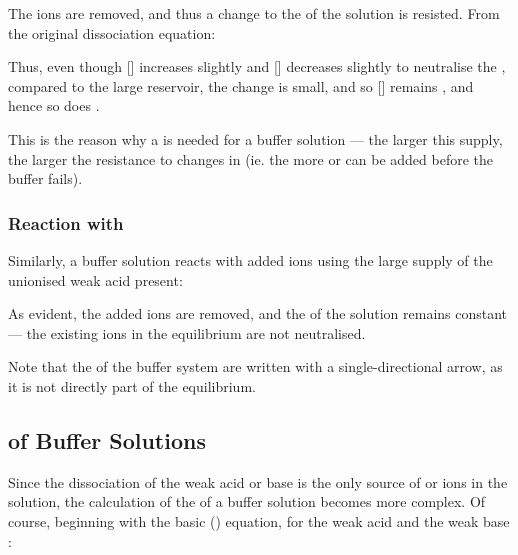 				The  ions are removed, and thus a change to the \pH{} of the solution is resisted. From the original dissociation
				equation:

				\diagram[1.5]{
					$[H^{+}] = \MKa \times \frac{[CH_{3}CO_{2}H]}{[CH_{3}CO_{2}^{-}]}$
				}{}

				Thus, even though [] increases slightly and [] decreases slightly to neutralise the , compared
				to the large reservoir, the change is small, and so [] remains , and hence so does \pH{}.

				This is the reason why a  is needed for a buffer solution --- the larger this supply, the larger the
				resistance to changes in \pH{} (ie. the more  or  can be added before the buffer fails).



			\pagebreak
			\subsubsection{Reaction with \texorpdfstring{}{OH⁻}}

				Similarly, a buffer solution reacts with added  ions using the large supply of the unionised weak acid present:


				As evident, the added  ions are removed, and the \pH{} of the solution remains constant --- the existing  ions
				in the equilibrium are not neutralised.

				Note that the  of the buffer system are written with a single-directional arrow, as it is not
				directly part of the equilibrium.



		\subsection{\texorpdfstring{\pH{}}{pH} of Buffer Solutions}

			Since the dissociation of the weak acid or base is  the only source of  or  ions in the solution,
			the calculation of the \pH{} of a buffer solution becomes more complex. Of course, beginning with the basic ()
			equation, for the weak acid  and the weak base :


